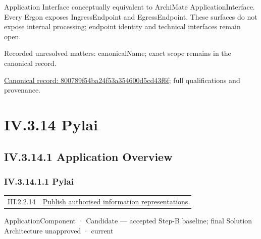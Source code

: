 Application Interface conceptually equivalent to ArchiMate ApplicationInterface.
Every Ergon exposes IngressEndpoint and EgressEndpoint. These surfaces do not
expose internal processing; endpoint identity and technical interfaces remain open.


{\small Recorded unresolved matters: canonicalName; exact scope remains in the canonical record.}\par
{\footnotesize \href{../../../../../../../../continuum/application/application-interface/800789f54ba24f53a354600d5cd43f6f.md}{Canonical record: 800789f54ba24f53a354600d5cd43f6f}; full qualifications and provenance.}\par
\section*{IV.3.14 Pylai}
\label{navigation:IV.3.14}

\subsection*{IV.3.14.1 Application Overview}
\label{navigation:IV.3.14.1}

\subsubsection*{IV.3.14.1.1 Pylai}
\label{navigation:IV.3.14.1.1}

\begin{longtable}{p{.22\linewidth}p{.73\linewidth}}
III.2.2.14 & \hyperref[element:91da459e860e4f359e440a65f0c94bcb]{Publish authorised information representations} \\
\end{longtable}
\label{element:e3e4147fea3640198dc251ed41ee854d}
{\small ApplicationComponent · Candidate — accepted Step-B baseline; final Solution Architecture unapproved · current}\par

